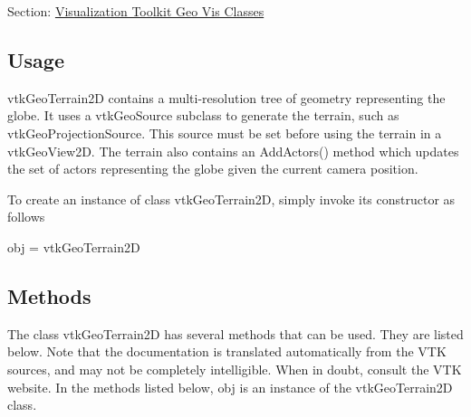 Section\-: \hyperlink{sec_vtkgeovis}{Visualization Toolkit Geo Vis Classes} \hypertarget{vtkwidgets_vtkxyplotwidget_Usage}{}\subsection{Usage}\label{vtkwidgets_vtkxyplotwidget_Usage}
vtk\-Geo\-Terrain2\-D contains a multi-\/resolution tree of geometry representing the globe. It uses a vtk\-Geo\-Source subclass to generate the terrain, such as vtk\-Geo\-Projection\-Source. This source must be set before using the terrain in a vtk\-Geo\-View2\-D. The terrain also contains an Add\-Actors() method which updates the set of actors representing the globe given the current camera position.

To create an instance of class vtk\-Geo\-Terrain2\-D, simply invoke its constructor as follows \begin{DoxyVerb}  obj = vtkGeoTerrain2D
\end{DoxyVerb}
 \hypertarget{vtkwidgets_vtkxyplotwidget_Methods}{}\subsection{Methods}\label{vtkwidgets_vtkxyplotwidget_Methods}
The class vtk\-Geo\-Terrain2\-D has several methods that can be used. They are listed below. Note that the documentation is translated automatically from the V\-T\-K sources, and may not be completely intelligible. When in doubt, consult the V\-T\-K website. In the methods listed below, {\ttfamily obj} is an instance of the vtk\-Geo\-Terrain2\-D class. 
